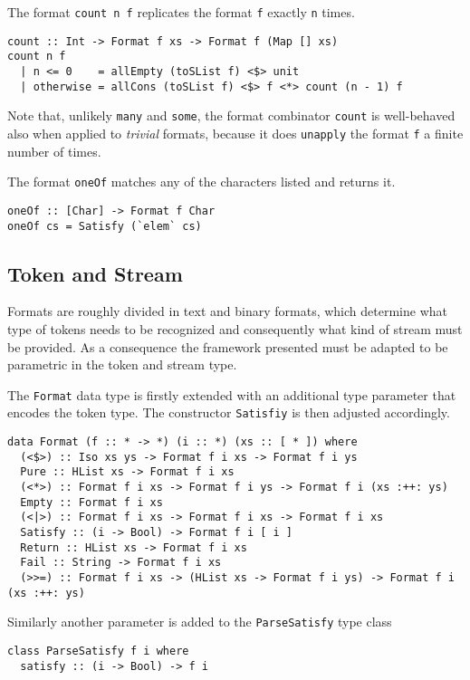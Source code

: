 \documentclass[../Thesis.tex]{subfiles}
\begin{document}
The format \texttt{count n f} replicates the format \texttt{f} exactly \texttt{n} times.
\begin{verbatim}
count :: Int -> Format f xs -> Format f (Map [] xs)
count n f
  | n <= 0    = allEmpty (toSList f) <$> unit
  | otherwise = allCons (toSList f) <$> f <*> count (n - 1) f
\end{verbatim}

Note that, unlikely \texttt{many} and \texttt{some}, the format combinator 
\texttt{count} is well-behaved also when applied to \emph{trivial} formats, 
because it does \texttt{unapply} the format \texttt{f} a finite number of times.

The format \texttt{oneOf} matches any of the characters listed and returns it.

\begin{verbatim}
oneOf :: [Char] -> Format f Char
oneOf cs = Satisfy (`elem` cs) 
\end{verbatim}

\subsection{Token and Stream}
\label{subsec:TokenAndStream}
Formats are roughly divided in text and binary formats, which determine what type of tokens needs to be recognized and consequently what kind of stream 
must be provided. As a consequence the framework presented must be adapted to be parametric in the token and stream type.

The \texttt{Format} data type is firstly extended with an additional type parameter that encodes the token type. The constructor \texttt{Satisfiy} is then
adjusted accordingly.

\begin{verbatim}
data Format (f :: * -> *) (i :: *) (xs :: [ * ]) where
  (<$>) :: Iso xs ys -> Format f i xs -> Format f i ys
  Pure :: HList xs -> Format f i xs
  (<*>) :: Format f i xs -> Format f i ys -> Format f i (xs :++: ys)
  Empty :: Format f i xs
  (<|>) :: Format f i xs -> Format f i xs -> Format f i xs
  Satisfy :: (i -> Bool) -> Format f i [ i ]
  Return :: HList xs -> Format f i xs
  Fail :: String -> Format f i xs
  (>>=) :: Format f i xs -> (HList xs -> Format f i ys) -> Format f i (xs :++: ys)
\end{verbatim}

Similarly another parameter is added to the \texttt{ParseSatisfy} type class
\begin{verbatim}
class ParseSatisfy f i where
  satisfy :: (i -> Bool) -> f i
\end{verbatim}
\end{document}
